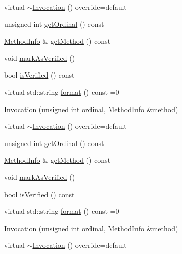 \begin{DoxyCompactItemize}
\item 
virtual \mbox{\hyperlink{structfakeit_1_1Invocation_a027b5d4605055387939c6e37cb01a427}{$\sim$\+Invocation}} () override=default
\item 
unsigned int \mbox{\hyperlink{structfakeit_1_1Invocation_a86b6f74924a9fed6b8760c2ba86a249b}{get\+Ordinal}} () const
\item 
\mbox{\hyperlink{structfakeit_1_1MethodInfo}{Method\+Info}} \& \mbox{\hyperlink{structfakeit_1_1Invocation_ae0b909794e14d6bba7db6baaef471865}{get\+Method}} () const
\item 
void \mbox{\hyperlink{structfakeit_1_1Invocation_a4579628568d7b469a1d225b3d43822e5}{mark\+As\+Verified}} ()
\item 
bool \mbox{\hyperlink{structfakeit_1_1Invocation_ae1c4e0840951bd5be209fd02196ecc59}{is\+Verified}} () const
\item 
virtual std\+::string \mbox{\hyperlink{structfakeit_1_1Invocation_ad6bf5d7b6ae2897c5d6bbb51183b8c1d}{format}} () const =0
\item 
\mbox{\hyperlink{structfakeit_1_1Invocation_a65e80c1f6eb1c04f7e6c48df5bd229a6}{Invocation}} (unsigned int ordinal, \mbox{\hyperlink{structfakeit_1_1MethodInfo}{Method\+Info}} \&method)
\item 
virtual \mbox{\hyperlink{structfakeit_1_1Invocation_a027b5d4605055387939c6e37cb01a427}{$\sim$\+Invocation}} () override=default
\item 
unsigned int \mbox{\hyperlink{structfakeit_1_1Invocation_a86b6f74924a9fed6b8760c2ba86a249b}{get\+Ordinal}} () const
\item 
\mbox{\hyperlink{structfakeit_1_1MethodInfo}{Method\+Info}} \& \mbox{\hyperlink{structfakeit_1_1Invocation_ae0b909794e14d6bba7db6baaef471865}{get\+Method}} () const
\item 
void \mbox{\hyperlink{structfakeit_1_1Invocation_a4579628568d7b469a1d225b3d43822e5}{mark\+As\+Verified}} ()
\item 
bool \mbox{\hyperlink{structfakeit_1_1Invocation_ae1c4e0840951bd5be209fd02196ecc59}{is\+Verified}} () const
\item 
virtual std\+::string \mbox{\hyperlink{structfakeit_1_1Invocation_ad6bf5d7b6ae2897c5d6bbb51183b8c1d}{format}} () const =0
\item 
\mbox{\hyperlink{structfakeit_1_1Invocation_a65e80c1f6eb1c04f7e6c48df5bd229a6}{Invocation}} (unsigned int ordinal, \mbox{\hyperlink{structfakeit_1_1MethodInfo}{Method\+Info}} \&method)
\item 
virtual \mbox{\hyperlink{structfakeit_1_1Invocation_a027b5d4605055387939c6e37cb01a427}{$\sim$\+Invocation}} () override=default

\end{DoxyCompactItemize}
